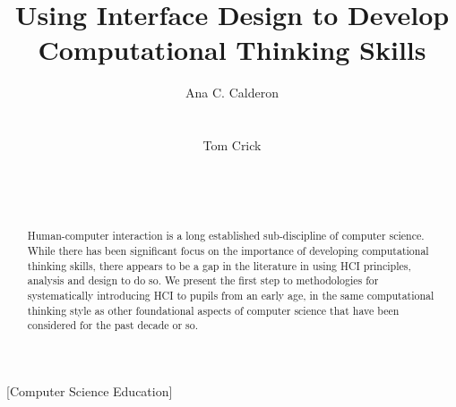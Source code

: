 \documentclass{sig-alternate}
\begin{document}
%

\title{Using Interface Design to Develop\\Computational Thinking Skills}


\author{
\alignauthor
Ana C. Calderon\\
\\
\\
\alignauthor
Tom Crick\\
\\
\\
\\
}

\maketitle

\begin{abstract}
Human-computer interaction is a long established sub-discipline of
computer science. While there has been significant focus on the
importance of developing computational thinking skills, there appears
to be a gap in the literature in using HCI principles, analysis and
design to do so. We present the first step to methodologies for
systematically introducing HCI to pupils from an early age, in the
same computational thinking style as other foundational aspects of
computer science that have been considered for the past decade or so.
\end{abstract}

[Computer Science Education]
\end{document}
